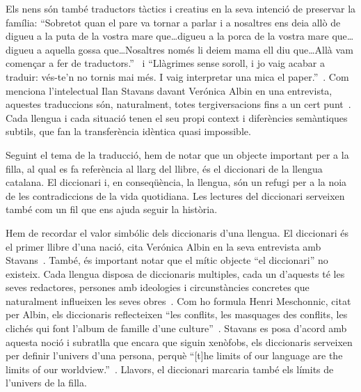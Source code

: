 Els nens són també traductors tàctics i creatius en la seva intenció de preservar la família:
``Sobretot quan el pare va tornar a parlar i a nosaltres ens deia allò de digueu a la puta de la vostra mare que\ldots digueu a la porca de la vostra mare que\ldots digueu a aquella gossa que\ldots Nosaltres només li deiem mama ell diu que\ldots Allà vam començar a fer de traductors.''~\autocite[177]{ElHachmi2008}
i ``Llàgrimes sense soroll, i jo vaig acabar a traduir: vés-te'n  no tornis mai més. I vaig interpretar una mica el paper.''~\autocite[223--224]{ElHachmi2008}.
Com menciona l'intelectual Ilan Stavans davant Verónica Albin en una entrevista, aquestes traduccions són, naturalment, totes tergiversacions fins a un cert punt~\autocite{Albin2005}.
Cada llengua i cada situació tenen el seu propi context i diferències semàntiques subtils, que fan la transferència idèntica quasi impossible.

Seguint el tema de la traducció, hem de notar que
un objecte important per a la filla, al qual es fa referència al llarg del llibre, és el diccionari de la llengua catalana.
El diccionari i, en conseqüència, la llengua, són un refugi per a la noia de les contradiccions de la vida quotidiana.
Les lectures del diccionari serveixen també com un fil que ens ajuda seguir la història.

Hem de recordar el valor simbólic dels diccionaris d'una llengua.
El diccionari és el primer llibre d'una nació, cita Verónica Albin en la seva entrevista amb Stavans~\autocite{Albin2005}.
També, és important notar que el mític objecte ``el diccionari'' no existeix.
Cada llengua disposa de diccionaris multiples, cada un d'aquests té les seves redactores, persones amb ideologies i circunstàncies concretes que naturalment influeixen les seves obres~\autocite{Albin2005}.
Com ho formula Henri Meschonnic, citat per Albin, els diccionaris reflecteixen ``les conflits, les masquages des
conflits, les clichés qui font l'album de famille d'une culture''~\autocite{Albin2005}.
Stavans es posa d'acord amb aquesta noció i subratlla que encara que siguin xenòfobs, els diccionaris serveixen per definir l'univers d'una persona,
perquè ``[t]he limits of our language are the limits of our worldview.''~\autocite{Albin2005}.
Llavors, el diccionari marcaria també els límits de l'univers de la filla.

